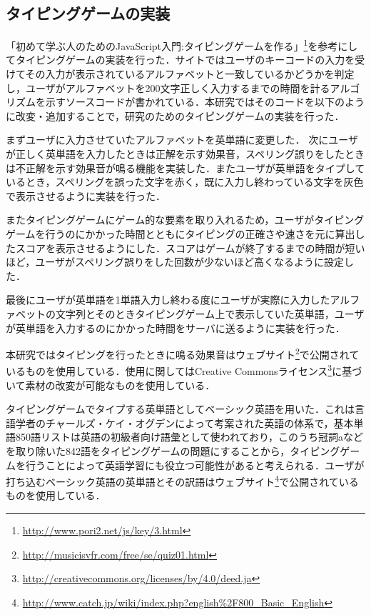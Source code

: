 \documentclass{jarticle}
\begin{document}
\subsection{タイピングゲームの実装}
「初めて学ぶ人のためのJavaScript入門:タイピングゲームを作る」\footnote{\url{http://www.pori2.net/js/key/3.html}}を参考にしてタイピングゲームの実装を行った．サイトではユーザのキーコードの入力を受けてその入力が表示されているアルファベットと一致しているかどうかを判定し，ユーザがアルファベットを200文字正しく入力するまでの時間を計るアルゴリズムを示すソースコードが書かれている．本研究ではそのコードを以下のように改変・追加することで，研究のためのタイピングゲームの実装を行った．

まずユーザに入力させていたアルファベットを英単語に変更した．
次にユーザが正しく英単語を入力したときは正解を示す効果音，スペリング誤りをしたときは不正解を示す効果音が鳴る機能を実装した．またユーザが英単語をタイプしているとき，スペリングを誤った文字を赤く，既に入力し終わっている文字を灰色で表示させるように実装を行った．

またタイピングゲームにゲーム的な要素を取り入れるため，ユーザがタイピングゲームを行うのにかかった時間とともにタイピングの正確さや速さを元に算出したスコアを表示させるようにした．スコアはゲームが終了するまでの時間が短いほど，ユーザがスペリング誤りをした回数が少ないほど高くなるように設定した．

最後にユーザが英単語を1単語入力し終わる度にユーザが実際に入力したアルファベットの文字列とそのときタイピングゲーム上で表示していた英単語，ユーザが英単語を入力するのにかかった時間をサーバに送るように実装を行った．

本研究ではタイピングを行ったときに鳴る効果音はウェブサイト\footnote{\url{http://musicisvfr.com/free/se/quiz01.html}}で公開されているものを使用している．使用に関してはCreative Commonsライセンス\footnote{\url{http://creativecommons.org/licenses/by/4.0/deed.ja}}に基づいて素材の改変が可能なものを使用している．

タイピングゲームでタイプする英単語としてベーシック英語\cite{simpleenglish}を用いた．これは言語学者のチャールズ・ケイ・オグデンによって考案された英語の体系で，基本単語850語リストは英語の初級者向け語彙として使われており，このうち冠詞aなどを取り除いた842語をタイピングゲームの問題にすることから，タイピングゲームを行うことによって英語学習にも役立つ可能性があると考えられる．ユーザが打ち込むベーシック英語の英単語とその訳語はウェブサイト\footnote{\url{http://www.catch.jp/wiki/index.php?english\%2F800_Basic_English}}で公開されているものを使用している．
\end{document}
